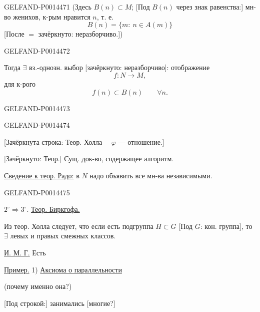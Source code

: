 \begin{GelfandAdjacentEvidence}{GELFAND-P001447}{1}
(Здесь \(B(n)\subset M\);
[Под \(B(n)\) через знак равенства:] мн-во женихов, к-рым нравится \(n\), т. е.
\[
B(n)=\{m:\ n\in A(m)\}
\]
[После \(=\) зачёркнуто: неразборчиво.])
\end{GelfandAdjacentEvidence}
\begin{GelfandAdjacentEvidence}{GELFAND-P001447}{2}


Тогда \(\exists\) вз.-однозн. выбор [зачёркнуто: неразборчиво]: отображение
\[
f\colon N\longrightarrow M,
\]
для к-рого
\[
f(n)\subset B(n)\qquad \forall n.
\]
\end{GelfandAdjacentEvidence}
\begin{GelfandAdjacentEvidence}{GELFAND-P001447}{3}

\end{GelfandAdjacentEvidence}
\begin{GelfandAdjacentEvidence}{GELFAND-P001447}{4}


[Зачёркнута строка: Теор. Холла \(\quad\varphi\) — отношение.]

[Зачёркнуто: Теор.] Сущ. док-во, содержащее алгоритм.

\uline{Сведение к теор. Радо:} в \(N\) надо объявить все мн-ва независимыми.
\end{GelfandAdjacentEvidence}
\begin{GelfandAdjacentEvidence}{GELFAND-P001447}{5}


\(2^\circ\Rightarrow3^\circ\). \uline{Теор. Биркгофа.}

Из теор. Холла следует, что если есть подгруппа \(H\subset G\)
[Под \(G\): кон. группа], то \(\exists\)  левых и правых смежных классов.

\uline{И. М. Г.} Есть 

\uline{Пример.} 1) \uline{Аксиома о параллельности}

(почему именно она?)

[Под строкой:] занимались [многие?]
\end{GelfandAdjacentEvidence}
